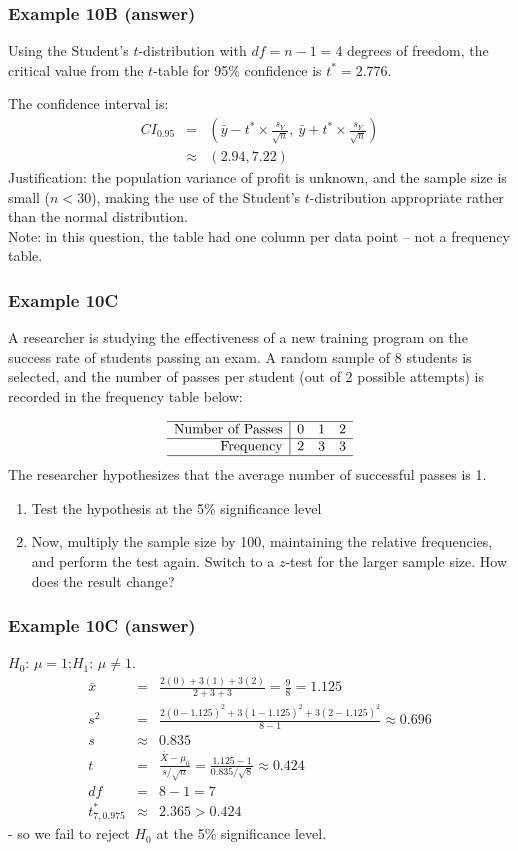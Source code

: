 \documentclass[t,8pt]{beamer}
\begin{document}
\begin{frame}
	\frametitle{Example 10B (answer)}
	Using the Student's $t$-distribution with \( df = n-1 = 4 \) degrees of freedom, the critical value from the $t$-table for 95\% confidence is \( t^* = 2.776 \). \par
	The confidence interval is:
	\begin{eqnarray*}
		CI_{0.95}
		&=&\left(\bar{y}-t^*\times\frac{s_Y}{\sqrt{n}},\ \bar{y}+t^*\times\frac{s_Y}{\sqrt{n}}\right)\\[4pt]
		&\approx&(2.94, 7.22)
	\end{eqnarray*}
	Justification: the population variance of profit is unknown, and the sample size is small (\( n < 30 \)), making the use of the Student’s $t$-distribution appropriate rather than the normal distribution. \\[4pt]
	{\small\color{NavyBlue} Note: in this question, the table had one column per data point – not a frequency table.}
\end{frame}

\begin{frame}
	\frametitle{Example 10C}
	A researcher is studying the effectiveness of a new training program on the success rate of students passing an exam. A random sample of 8 students is selected, and the number of passes per student (out of 2 possible attempts) is recorded in the frequency table below:
	
	\[
	\begin{array}{r|ccc}
		\hline
		\text{Number of Passes} & 0 & 1 & 2 \\
		\hline
		\text{Frequency} & 2 & 3 & 3 \\
		\hline
	\end{array}
	\]
	The researcher hypothesizes that the average number of successful passes is 1.
	\begin{enumerate}
		\item Test the hypothesis at the 5\% significance level
		\item Now, multiply the sample size by 100, maintaining the relative frequencies, and perform the test again. Switch to a $z$-test for the larger sample size. How does the result change?
	\end{enumerate}
\end{frame}

\begin{frame}
	\frametitle{Example 10C (answer)}
	$H_0$: $\mu=1$;\quad $H_1$: $\mu\neq 1$.
	\begin{eqnarray*}
		\bar{x} &=& \frac{2(0) + 3(1) + 3(2)}{2 + 3 + 3} = \frac{9}{8} = 1.125 \\[4pt]
		s^2 &=& \frac{2(0 - 1.125)^2 + 3(1 - 1.125)^2 + 3(2 - 1.125)^2}{8 - 1}
		\approx 0.696 \\[4pt]
		s &\approx& 0.835 \\[4pt]
		t &=& \frac{\bar{X} - \mu_0}{s / \sqrt{n}}
		= \frac{1.125 - 1}{0.835 / \sqrt{8}}
		\approx 0.424 \\[4pt]
		df &=& 8 - 1 = 7 \\[4pt]
		t^*_{7,0.975} &\approx& 2.365>0.424
	\end{eqnarray*}
	- so we fail to reject $H_0$ at the 5\% significance level.
\end{frame}
\end{document}
